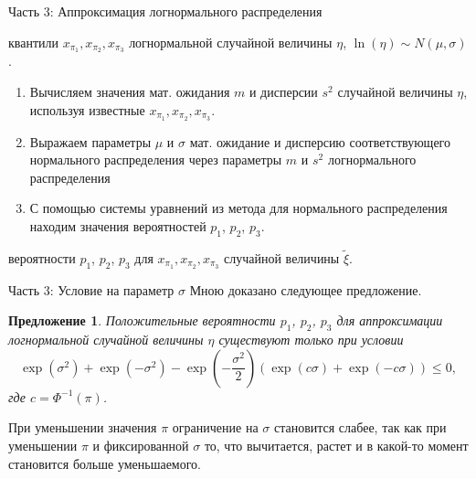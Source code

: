 \documentclass[ucs, notheorems, handout]{beamer}
\newtheorem{proposition2}[theorem]{Предложение}
\newenvironment{pr1}{\par\noindent{\bf Дано:}}{}
\newenvironment{pr3}{\par\noindent{\bf Результат:}}{}
\begin{document}
	
	\begin{frame}{Часть 3: Аппроксимация логнормального распределения}
			\begin{pr1}
				квантили $x_{\pi_{1}}, x_{\pi_{2}}, x_{\pi_{3}}$ логнормальной случайной величины $\eta$, $\ln(\eta) \sim N(\mu, \sigma)$.
			\end{pr1}
		
		\bigskip
		
			\begin{enumerate}
				\item Вычисляем значения мат. ожидания $m$ и дисперсии $s^{2}$ случайной величины $\eta$, используя известные $x_{\pi_{1}}, x_{\pi_{2}}, x_{\pi_{3}}$.
				\item Выражаем параметры $\mu$ и $\sigma$ мат. ожидание и дисперсию соответствующего нормального распределения через параметры $m$ и $s^{2}$ логнормального распределения
				\item С помощью системы уравнений из метода для нормального распределения находим значения вероятностей $p_{1}$, $p_{2}$, $p_{3}$.
			\end{enumerate}
		\bigskip
			\begin{pr3}\end{pr3} вероятности $p_{1}$, $p_{2}$, $p_{3}$ для $x_{\pi_{1}}, x_{\pi_{2}}, x_{\pi_{3}}$ случайной величины $\tilde{\xi}$.
		
	\end{frame}

\begin{frame}{Часть 3: Условие на параметр $\sigma$}
	Мною доказано следующее предложение.
		\begin{proposition2}
		Положительные вероятности $p_{1}$, $p_{2}$, $p_{3}$ для аппроксимации логнормальной случайной величины $\eta$ существуют только при условии \[\exp(\sigma^{2})+\exp(-\sigma^{2})-\exp\left( -\dfrac{\sigma^{2}}{2}\right) 
		(\exp(c\sigma)+\exp(-c\sigma))\leq 0,\] 
		где $c = \Phi^{-1}(\pi)$.
	\end{proposition2}
	
	При уменьшении значения $\pi$ ограничение на $\sigma$ становится слабее, так как при уменьшении $\pi$ и фиксированной $\sigma$ то, что вычитается, растет и в какой-то
	момент становится больше уменьшаемого.

\end{frame}
\end{document}
